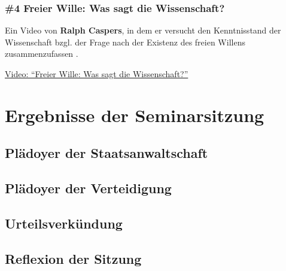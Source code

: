 \documentclass[
  a4paper,
]{report}
\begin{document}
\hypertarget{def-expert-ev4}{%
\subsection{\#4 Freier Wille: Was sagt die Wissenschaft?}\label{def-expert-ev4}}

Ein Video von \textbf{Ralph Caspers}, in dem er versucht den Kenntnisstand der Wissenschaft bzgl. der Frage nach der Existenz des freien Willens zusammenzufassen \citep{Caspers2021}.

\href{https://www.youtube.com/watch?v=45Iut50Cm_Q}{Video: ``Freier Wille: Was sagt die Wissenschaft?''}

\hypertarget{results}{%
\chapter{Ergebnisse der Seminarsitzung}\label{results}}

\hypertarget{pr-plea}{%
\section{Plädoyer der Staatsanwaltschaft}\label{pr-plea}}

\hypertarget{def-plea}{%
\section{Plädoyer der Verteidigung}\label{def-plea}}

\hypertarget{sentencing}{%
\section{Urteilsverkündung}\label{sentencing}}

\hypertarget{reflection}{%
\section{Reflexion der Sitzung}\label{reflection}}

  
\end{document}
